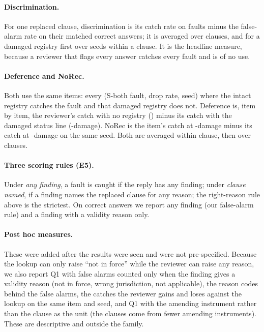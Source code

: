 \paragraph{Discrimination.}
For one replaced clause, discrimination is its catch rate on faults minus the false-alarm rate on their matched correct
answers; it is averaged over clauses, and for a damaged registry first over seeds within a clause. It is the headline
measure, because a reviewer that flags every answer catches every fault and is of no use.

\paragraph{Deference and NoRec.}
Both use the same items: every (S-both fault, drop rate, seed) where the intact registry catches the fault and that
damaged registry does not. Deference is, item by item, the reviewer's catch with no registry ()
minus its catch with the damaged status line (-damage). NoRec is the item's catch at -damage minus its
catch at -damage on the same seed. Both are averaged within clause, then over clauses.

\paragraph{Three scoring rules (E5).}
Under \emph{any finding}, a fault is caught if the reply has any finding; under \emph{clause named}, if a finding names
the replaced clause for any reason; the right-reason rule above is the strictest. On correct answers we report any finding
(our false-alarm rule) and a finding with a validity reason only.

\paragraph{Post hoc measures.} These were added after the results were seen and were not pre-specified.
Because the lookup can only raise ``not in force'' while the reviewer can raise any reason, we also report Q1 with false
alarms counted only when the finding gives a validity reason (not in force, wrong jurisdiction, not applicable), the
reason codes behind the false alarms, the catches the reviewer gains and loses against the lookup on the same item and
seed, and Q1 with the amending instrument rather than the clause as the unit (the \NClauses{} clauses come from fewer
amending instruments). These are descriptive and outside the family.

